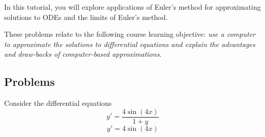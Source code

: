 		\begin{objectives}
			In this tutorial, you will explore applications of Euler's method for approximating solutions to ODEs
			and the limits of Euler's method.

			These problems relate to the following course learning
			objective: \textit{use a computer to approximate the solutions to differential equations 
			and explain the advantages and draw-backs of computer-based approximations}.
		\end{objectives}



		\subsection*{Problems}
		
		Consider the differential equations
		\begin{equation}
			\label{tut1-ode}
			y'=\frac{4\sin(4x)}{1+y}
		\end{equation}
		\begin{equation}
			\label{tut1-ode2}
			y'=4\sin(4x)
		\end{equation}

